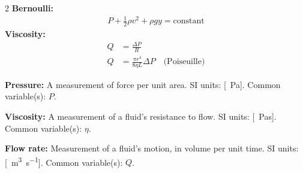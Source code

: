 {{\begin{importantEquations}
\begin{multicols}{2}
\textbf{Bernoulli:}
\begin{align*}
P+\frac{1}{2}\rho v^2+\rho gy=\textrm{constant}
\end{align*}
\textbf{Viscosity:}
\begin{align*}
Q&=\frac{\Delta P}{R}\\
Q&= \frac{\pi r^4}{8\eta L}\Delta P \quad \textrm{(Poiseuille)}
\end{align*}
\end{multicols}
\end{importantEquations}

\begin{definitions}
	\item \textbf{Pressure:} A measurement of force per unit area. SI units: [\SI{}{Pa}]. Common variable(s): $P$.
	\item \textbf{Viscosity:} A measurement of a fluid's resistance to flow. SI units: [\SI{}{Pas}]. Common variable(s): $\eta$.
	\item \textbf{Flow rate:} Measurement of a fluid's motion, in volume per unit time. SI units: [\SI{}{m^3s^{-1}}]. Common variable(s): $Q$.
\end{definitions}
\newpage
}}
